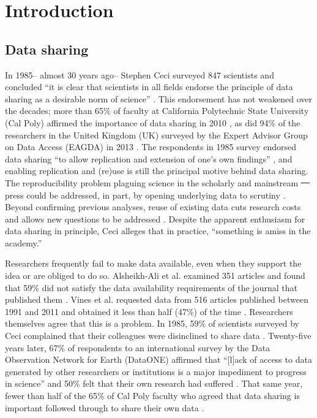 \documentclass[10pt]{article}
\providecommand{\DIFaddtex}[1]{{\protect\color{blue}\uwave{#1}}} %
\providecommand{\DIFdeltex}[1]{{\protect\color{red}\sout{#1}}}                      %
\providecommand{\DIFaddbegin}{} %
\providecommand{\DIFaddend}{} %
\providecommand{\DIFdelbegin}{} %
\providecommand{\DIFdelend}{} %
\providecommand{\DIFadd}[1]{\texorpdfstring{\DIFaddtex{#1}}{#1}} %
\providecommand{\DIFdel}[1]{\texorpdfstring{\DIFdeltex{#1}}{}} %
\begin{document}
\section*{Introduction}

\subsection*{Data sharing}

In 1985-- almost 30 years ago-- Stephen Ceci surveyed 847 scientists and concluded ``it is clear that scientists in all fields endorse the principle of data sharing as a desirable norm of science'' \cite{ceci_scientists_1988}.
This endorsement has not weakened over the decades; more than 65\% of faculty at California Polytechnic State University (Cal Poly) affirmed the importance of data sharing in 2010 \cite{scaramozzino_study_2012}, as did  94\% of the researchers in the United Kingdom (UK) surveyed by the Expert Advisor Group on Data Access (EAGDA) in 2013 \cite{bobrow_establishing_2014}.
The respondents in 1985 survey endorsed data sharing ``to allow replication and extension of one's own findings'' \cite{ceci_scientists_1988}, and enabling replication and (re)use is still the principal motive behind data sharing.
The reproducibility problem plaguing science in the scholarly \cite{ioannidis_why_2005, prinz_believe_2011, mobley_survey_2013} and mainstream \DIFdelbegin \DIFdel{\mbox{%
\cite{zimmer_rise_2012, _how_2013, editors_trouble_2013}
}%
}\DIFdelend \DIFaddbegin \DIFadd{\mbox{%
\cite{zimmer_rise_2012, editors_how_2013, editors_trouble_2013}
}%
}\DIFaddend press could be addressed, in part, by opening underlying data to scrutiny \cite{drew_lost_2013, collins_nih_2014}.
Beyond confirming previous analyses, reuse of existing data cuts research costs \cite{piwowar_data_2011} and allows new questions to be addressed \cite{stewart_meta-analysis_2010, borenstein_introduction_2011}.
Despite the apparent enthusiasm for data sharing in principle, Ceci alleges that in practice, ``something is amiss in the academy.''

Researchers frequently fail to make data available, even when they support the idea or are obliged to do so.
Alsheikh-Ali et al. examined 351 articles and found that 59\% did not satisfy the data availability requirements of the journal that published them \cite{alsheikh-ali_public_2011}.
Vines et al. requested data from 516 articles published between 1991 and 2011 and obtained it less than half (47\%) of the time \cite{vines_availability_2014}.
Researchers themselves agree that this is a problem.
In 1985, 59\% of scientists surveyed by Ceci complained that their colleagues were disinclined to share data \cite{ceci_scientists_1988}.
Twenty-five years later, 67\% of respondents to an international survey by the Data Observation Network for Earth (DataONE) affirmed that ``[l]ack of access to data generated by other researchers or institutions is a major impediment to progress in science'' and 50\% felt that their own research had suffered \cite{tenopir_data_2011}.
That same year, fewer than half of the 65\% of Cal Poly faculty who agreed that data sharing is important followed through to share their own data \cite{scaramozzino_study_2012}.
\end{document}
